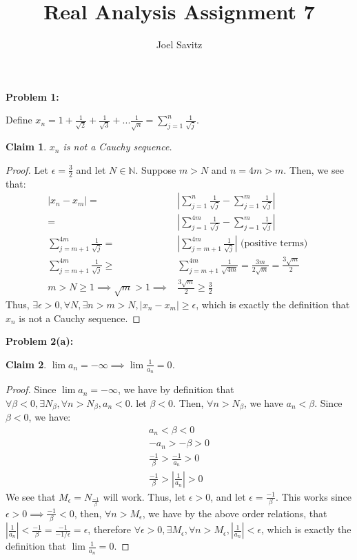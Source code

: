 \documentclass{article}
\title{Real Analysis Assignment 7}
\author{Joel Savitz}
\newcommand{\nats}{\ensuremath{\mathbb{N}}}
\newcommand{\eps}{\ensuremath{\epsilon}}
\newtheorem{clm}{Claim}
\begin{document}
\maketitle

\textbf{Problem 1:}

Define $x_n = 1 + \frac{1}{\sqrt{2}} + \frac{1}{\sqrt{3}} + ... \frac{1}{\sqrt{n}} = \sum_{j=1}^{n} \frac{1}{\sqrt{j}}$.

\begin{clm}
	$x_n$ is not a Cauchy sequence.
\end{clm}

\begin{proof}
	Let $\eps = \frac{3}{2}$ and let $N \in \nats$.
	Suppose $m > N$ and $n = 4m > m$.
	Then, we see that:
	\begin{align}
		|x_n - x_m| = & |\sum_{j=1}^{n} \frac{1}{\sqrt{j}} - \sum_{j=1}^{m}\frac{1}{\sqrt{j}}| \\
			    = & |\sum_{j=1}^{4m} \frac{1}{\sqrt{j}} - \sum_{j=1}^{m}\frac{1}{\sqrt{j}}| \\
		\sum_{j=m+1}^{4m} \frac{1}{\sqrt{j}} = & |\sum_{j=m+1}^{4m} \frac{1}{\sqrt{j}}| \textrm{ (positive terms) } \\ 
		\sum_{j=m+1}^{4m} \frac{1}{\sqrt{j}} \geq & \sum_{j=m+1}^{4m} \frac{1}{\sqrt{4m}}
		= \frac{3m}{2\sqrt{m}} = \frac{3\sqrt{m}}{2} \\
		m > N \geq 1 \implies \sqrt{m} > 1 \implies & \frac{3\sqrt{m}}{2} \geq \frac{3}{2}
	\end{align}
	Thus,
	$\exists \eps > 0, \forall N, \exists n > m > N, |x_n - x_m| \geq \eps$,
	which is exactly the definition that $x_n$ is not a Cauchy sequence.
\end{proof}

\textbf{Problem 2(a):}

\begin{clm}
	$\lim a_n = -\infty \implies \lim \frac{1}{a_n} = 0$.
\end{clm}

\begin{proof}
	Since $\lim a_n = -\infty$,
	we have by definition
	that $\forall \beta < 0, \exists N_\beta, \forall n > N_\beta, a_n < 0$.
	let $\beta < 0$. Then, $\forall n > N_\beta$, we have $a_n < \beta$.
	Since $\beta < 0$, we have:
	\begin{align}
		a_n < \beta < 0 \\
		-a_n > -\beta > 0 \\
		\frac{-1}{\beta} > \frac{-1}{a_n} > 0 \\
		\frac{-1}{\beta} > |\frac{1}{a_n}| > 0
	\end{align}
	We see that $M_\eps = N_\frac{-1}{\beta}$ will work.
	Thus, let $\eps > 0$,
	and let $\eps  = \frac{-1}{\beta}$.
	This works since $\eps > 0 \implies \frac{-1}{\beta} < 0$,
	then, $\forall n > M_\eps$,
	we have by the above order relations,
	that $|\frac{1}{a_n}| < \frac{-1}{\beta} = \frac{-1}{-1/\eps} = \eps$,
	therefore $\forall \eps > 0,
	\exists M_\eps,
	\forall n > M_\eps,
	|\frac{1}{a_n}| < \eps$,
	which is exactly the definition
	that $\lim \frac{1}{a_n} = 0$.
\end{proof}
\end{document}
